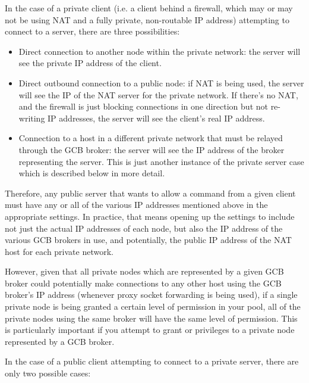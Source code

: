 In the case of a private client (i.e. a client behind a firewall,
which may or may not be using NAT and a fully private, non-routable IP
address) attempting to connect to a server, there are three
possibilities: 

\begin{itemize}

  \item Direct connection to another node within the private network:
  the server will see the private IP address of the client.

  \item Direct outbound connection to a public node: if NAT is being
  used, the server will see the IP of the NAT server for the private
  network.
  If there's no NAT, and the firewall is just blocking connections in
  one direction but not re-writing IP addresses, the server will see
  the client's real IP address.

  \item Connection to a host in a different private network that must
  be relayed through the GCB broker: the server will see the IP
  address of the broker representing the server.
  This is just another instance of the private server case which is
  described below in more detail.

\end{itemize}

Therefore, any public server that wants to allow a command from a
given client must have any or all of the various IP addresses
mentioned above in the appropriate  settings.  In
practice, that means opening up the  settings to
include not just the actual IP addresses of each node, but also the IP
address of the various GCB brokers in use, and potentially, the public
IP address of the NAT host for each private network.

However, given that all private nodes which are represented by a
given GCB broker could potentially make connections to any other
host using the GCB broker's IP address (whenever proxy socket
forwarding is being used), if a single private node is being granted
a certain level of permission in your pool, all of the private nodes
using the same broker will have the same level of permission.
This is particularly important if you attempt to grant
 or 
privileges to a private node represented by a GCB broker.

In the case of a public client attempting to connect to a private
server, there are only two possible cases:

